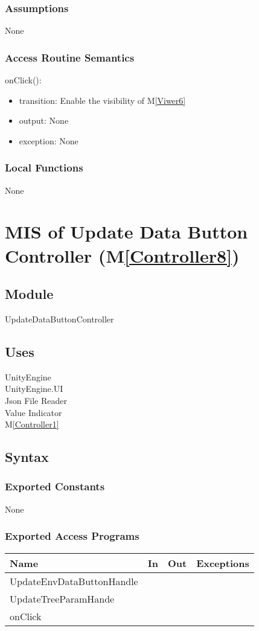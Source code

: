 \documentclass[12pt, titlepage]{article}
\newcommand{\mref}[1]{M\ref{#1}}
\begin{document}
\subsubsection{Assumptions}
None

\subsubsection{Access Routine Semantics}
onClick():
\begin{itemize}
    \item transition: Enable the visibility of  \mref{Viwer6}
    \item output: None
    \item exception: None
\end{itemize}
\subsubsection{Local Functions}
None
\newpage

\section{MIS of Update Data Button Controller (\mref{Controller8})} 

\subsection{Module}
UpdateDataButtonController
\subsection{Uses}
UnityEngine\\
UnityEngine.UI\\
Json File Reader\\
Value Indicator\\
\mref{Controller1}\\

\subsection{Syntax}

\subsubsection{Exported Constants}
None

\subsubsection{Exported Access Programs}
\begin{center}
\begin{tabular}{|p{6cm}|p{3cm}|p{3cm}| p{4cm}|}
\hline
\textbf{Name} & \textbf{In} & \textbf{Out} & \textbf{Exceptions} \\
\hline
 UpdateEnvDataButtonHandle& &  & \\
 UpdateTreeParamHande& &  & \\
 onClick & & &\\
\hline
\end{tabular}
\end{center}
\end{document}
